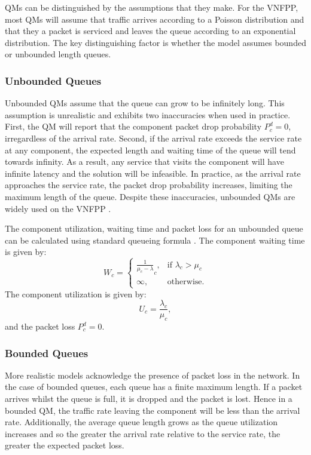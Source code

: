 QMs can be distinguished by the assumptions that they make. For the VNFPP, most QMs will assume that traffic arrives according to a Poisson distribution and that they a packet is serviced and leaves the queue according to an exponential distribution. The key distinguishing factor is whether the model assumes bounded or unbounded length queues.

\subsubsection{Unbounded Queues}
Unbounded QMs assume that the queue can grow to be infinitely long. This assumption is unrealistic and exhibits two inaccuracies when used in practice. First, the QM will report that the component packet drop probability $P^d_c = 0$, irregardless of the arrival rate. Second, if the arrival rate exceeds the service rate at any component, the expected length and waiting time of the queue will tend towards infinity. As a result, any service that visits the component will have infinite latency and the solution will be infeasible. In practice, as the arrival rate approaches the service rate, the packet drop probability increases, limiting the maximum length of the queue. Despite these inaccuracies, unbounded QMs are widely used on the VNFPP \cite{GouarebFA18,LeivadeasFLIK18,QuZYSLR20}.

The component utilization, waiting time and packet loss for an unbounded queue can be calculated using standard queueing formula \cite{Kleinrock75}. The component waiting time is given by:
\begin{equation}
	\label{eq:mm1_time_in_component}
    W_c =
    \begin{cases}
        \frac{1}{\mu_c - \lambda}_c, & \text{if } \lambda_c > \mu_c \\
        \infty,                  & \text{otherwise.}
    \end{cases}
\end{equation}
The component utilization is given by:
\begin{equation}
	\label{eq:mm1_utilization}
    U_c = \frac{\lambda_c}{\mu_c},
\end{equation}
and the packet loss $P^d_c = 0$.

\subsubsection{Bounded Queues}
More realistic models acknowledge the presence of packet loss in the network. In the case of bounded queues, each queue has a finite maximum length. If a packet arrives whilst the queue is full, it is dropped and the packet is lost. Hence in a bounded QM, the traffic rate leaving the component will be less than the arrival rate. Additionally, the average queue length grows as the queue utilization increases and so the greater the arrival rate relative to the service rate, the greater the expected packet loss. 

